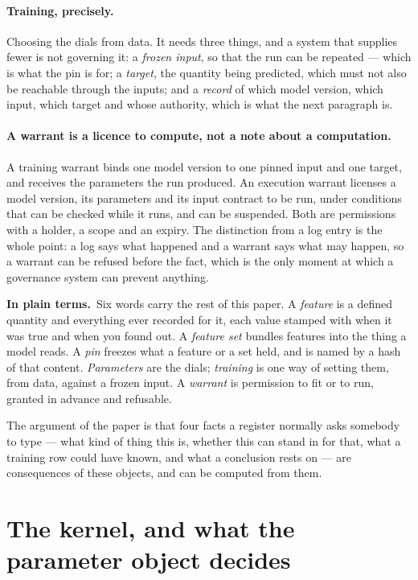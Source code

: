 \documentclass[11pt,a4paper]{article}
\renewcommand{\_}{\oldunderscore\allowbreak}
\theoremstyle{plain}
\theoremstyle{definition}
\theoremstyle{definition}
\theoremstyle{remark}
\newcommand{\pt}{\textbf{In plain terms.}\ }
\begin{document}
\paragraph{Training, precisely.} Choosing the dials from data. It needs three things, and a system that
supplies fewer is not governing it: a \emph{frozen input}, so that the run can be repeated --- which is
what the pin is for; a \emph{target}, the quantity being predicted, which must not also be reachable
through the inputs; and a \emph{record} of which model version, which input, which target and whose
authority, which is what the next paragraph is.

\paragraph{A warrant is a licence to compute, not a note about a computation.} A training warrant binds
one model version to one pinned input and one target, and receives the parameters the run produced. An
execution warrant licenses a model version, its parameters and its input contract to be run, under
conditions that can be checked while it runs, and can be suspended. Both are permissions with a holder,
a scope and an expiry. The distinction from a log entry is the whole point: a log says what happened
and a warrant says what may happen, so a warrant can be refused before the fact, which is the only
moment at which a governance system can prevent anything.

\begin{plain}
\pt Six words carry the rest of this paper. A \emph{feature} is a defined quantity and everything ever
recorded for it, each value stamped with when it was true and when you found out. A \emph{feature set}
bundles features into the thing a model reads. A \emph{pin} freezes what a feature or a set held, and is
named by a hash of that content. \emph{Parameters} are the dials; \emph{training} is one way of setting
them, from data, against a frozen input. A \emph{warrant} is permission to fit or to run, granted in
advance and refusable.

The argument of the paper is that four facts a register normally asks somebody to type --- what kind of
thing this is, whether this can stand in for that, what a training row could have known, and what a
conclusion rests on --- are consequences of these objects, and can be computed from them.
\end{plain}

\section{The kernel, and what the parameter object decides}\label{sec:kernel}
\end{document}
